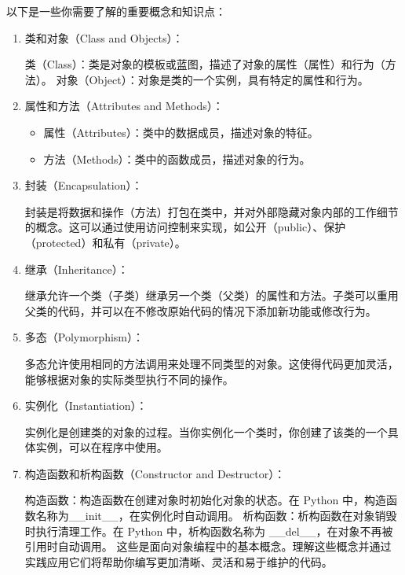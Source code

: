 \documentclass{article}
\begin{document}
以下是一些你需要了解的重要概念和知识点：
\begin{enumerate}
  

    \item 类和对象（Class and Objects）：

类（Class）：类是对象的模板或蓝图，描述了对象的属性（属性）和行为（方法）。
对象（Object）：对象是类的一个实例，具有特定的属性和行为。
\item 属性和方法（Attributes and Methods）：
\begin{itemize}
    \item 属性（Attributes）：类中的数据成员，描述对象的特征。
    \item 方法（Methods）：类中的函数成员，描述对象的行为。
\end{itemize}
\item 封装（Encapsulation）：

 封装是将数据和操作（方法）打包在类中，并对外部隐藏对象内部的工作细节的概念。这可以通过使用访问控制来实现，如公开（public）、保护（protected）和私有（private）。
\item 继承（Inheritance）：

继承允许一个类（子类）继承另一个类（父类）的属性和方法。子类可以重用父类的代码，并可以在不修改原始代码的情况下添加新功能或修改行为。
\item 多态（Polymorphism）：

多态允许使用相同的方法调用来处理不同类型的对象。这使得代码更加灵活，能够根据对象的实际类型执行不同的操作。
\item 实例化（Instantiation）：

实例化是创建类的对象的过程。当你实例化一个类时，你创建了该类的一个具体实例，可以在程序中使用。
\item 构造函数和析构函数（Constructor and Destructor）：

构造函数：构造函数在创建对象时初始化对象的状态。在 Python 中，构造函数名称为\_\_init\_\_，在实例化时自动调用。
析构函数：析构函数在对象销毁时执行清理工作。在 Python 中，析构函数名称为 \_\_del\_\_，在对象不再被引用时自动调用。
这些是面向对象编程中的基本概念。理解这些概念并通过实践应用它们将帮助你编写更加清晰、灵活和易于维护的代码。
\end{enumerate}
\end{document}
